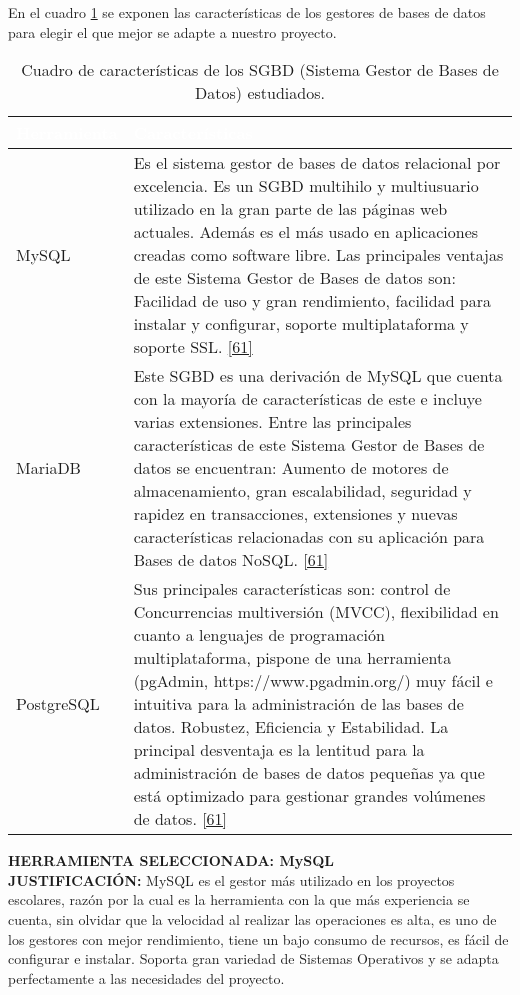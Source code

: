 \newpage

 En el cuadro \ref{tbl:sgbd} se exponen las características de los gestores de bases de datos para elegir el que mejor se adapte a nuestro proyecto.

\begin{table}[H]
	\centering
	\begin{tabular}{|p{3cm}|p{12cm}|}
		\hline
		\rowcolor{black} \textcolor{white} {\textbf{Herramienta}} & \textcolor{white}{\textbf{Características}}  \\ \hline
		MySQL & Es el sistema gestor de bases de datos relacional por excelencia.
		Es un SGBD multihilo y multiusuario utilizado en la gran parte de las páginas web actuales. Además es el más usado en aplicaciones creadas como software libre. 
		Las principales ventajas de este Sistema Gestor de Bases de datos son: Facilidad de uso y gran rendimiento, facilidad para instalar y configurar, soporte multiplataforma y soporte SSL. \hyperlink{b61}{[61]}\\
		\hline
		MariaDB & Este SGBD es una derivación de MySQL que cuenta con la mayoría de características de este e incluye varias extensiones. Entre las principales características de este Sistema Gestor de Bases de datos se encuentran: Aumento de motores de almacenamiento, gran escalabilidad, seguridad y rapidez en transacciones, extensiones y nuevas características relacionadas con su aplicación para Bases de datos NoSQL. \hyperlink{b61}{[61]} \\
		\hline
		PostgreSQL & Sus principales características son: control de Concurrencias multiversión (MVCC), flexibilidad en cuanto a lenguajes de programación multiplataforma, pispone de una herramienta (pgAdmin, https://www.pgadmin.org/) muy fácil e intuitiva para la administración de las bases de datos. Robustez, Eficiencia y Estabilidad.
		La principal desventaja es la lentitud para la administración de bases de datos pequeñas ya que está optimizado para gestionar grandes volúmenes de datos. \hyperlink{b61}{[61]}\\
		\hline
	\end{tabular}
	\caption{Cuadro de características de los SGBD (Sistema Gestor de Bases de Datos) estudiados.}
	\label{tbl:sgbd}
\end{table}

\textbf {HERRAMIENTA SELECCIONADA: MySQL}\\

\textbf {JUSTIFICACIÓN:}
MySQL es el gestor más utilizado en los proyectos escolares, razón por la cual es la herramienta con la que más experiencia se cuenta, sin olvidar que la velocidad al realizar las operaciones es alta, es uno de los gestores con mejor rendimiento, tiene un bajo consumo de recursos, es fácil de configurar e instalar. Soporta gran variedad de Sistemas Operativos y se adapta perfectamente a las necesidades del proyecto.
\newpage

